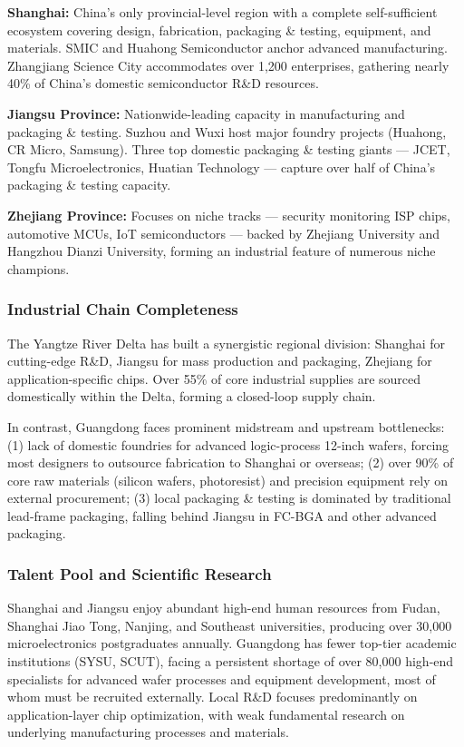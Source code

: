 \documentclass[12pt,a4paper]{article}
\begin{document}
\textbf{Shanghai:} China's only provincial-level region with a complete
self-sufficient ecosystem covering design, fabrication, packaging \&
testing, equipment, and materials. SMIC and Huahong Semiconductor anchor
advanced manufacturing. Zhangjiang Science City accommodates over 1,200
enterprises, gathering nearly 40\% of China's domestic semiconductor
R\&D resources.

\textbf{Jiangsu Province:} Nationwide-leading capacity in manufacturing
and packaging \& testing. Suzhou and Wuxi host major foundry projects
(Huahong, CR Micro, Samsung). Three top domestic packaging \& testing
giants — JCET, Tongfu Microelectronics, Huatian Technology — capture
over half of China's packaging \& testing capacity.

\textbf{Zhejiang Province:} Focuses on niche tracks — security monitoring
ISP chips, automotive MCUs, IoT semiconductors — backed by Zhejiang
University and Hangzhou Dianzi University, forming an industrial feature
of numerous niche champions.

\subsubsection{Industrial Chain Completeness}

The Yangtze River Delta has built a synergistic regional division:
Shanghai for cutting-edge R\&D, Jiangsu for mass production and
packaging, Zhejiang for application-specific chips. Over 55\% of core
industrial supplies are sourced domestically within the Delta, forming
a closed-loop supply chain.

In contrast, Guangdong faces prominent midstream and upstream
bottlenecks: (1) lack of domestic foundries for advanced logic-process
12-inch wafers, forcing most designers to outsource fabrication to
Shanghai or overseas; (2) over 90\% of core raw materials (silicon
wafers, photoresist) and precision equipment rely on external procurement;
(3) local packaging \& testing is dominated by traditional lead-frame
packaging, falling behind Jiangsu in FC-BGA and other advanced packaging.

\subsubsection{Talent Pool and Scientific Research}

Shanghai and Jiangsu enjoy abundant high-end human resources from Fudan,
Shanghai Jiao Tong, Nanjing, and Southeast universities, producing over
30,000 microelectronics postgraduates annually. Guangdong has fewer
top-tier academic institutions (SYSU, SCUT), facing a persistent shortage
of over 80,000 high-end specialists for advanced wafer processes and
equipment development, most of whom must be recruited externally. Local
R\&D focuses predominantly on application-layer chip optimization, with
weak fundamental research on underlying manufacturing processes and
materials.
\end{document}
